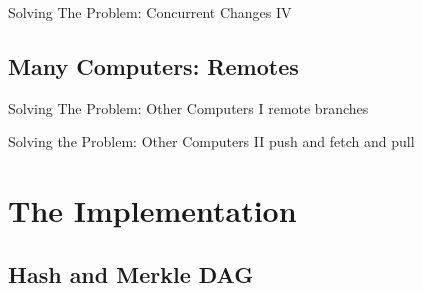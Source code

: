 \documentclass[xetex, handout]{beamer}
\begin{document}
\begin{frame}{Solving The Problem: Concurrent Changes IV}
\end{frame}

\subsection{Many Computers: Remotes}

\begin{frame}{Solving The Problem: Other Computers I}
  remote branches
\end{frame}

\begin{frame}{Solving the Problem: Other Computers II}
  push and fetch and pull
\end{frame}


\section{The Implementation}

\subsection{Hash and Merkle DAG}
\end{document}
